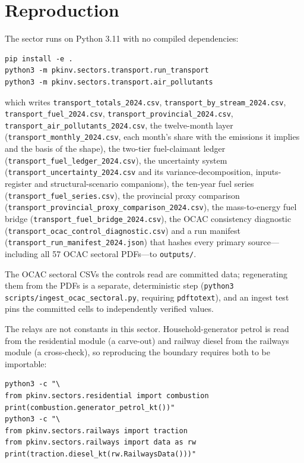 \section{Reproduction}
\label{app:repro}

The sector runs on Python 3.11 with no compiled dependencies:

{\footnotesize
\begin{verbatim}
pip install -e .
python3 -m pkinv.sectors.transport.run_transport
python3 -m pkinv.sectors.transport.air_pollutants
\end{verbatim}
}

which writes \texttt{transport\_totals\_2024.csv},
\texttt{transport\_by\_stream\_2024.csv}, \texttt{transport\_fuel\_2024.csv},
\texttt{transport\_provincial\_2024.csv},
\texttt{transport\_air\_pollutants\_2024.csv}, the twelve-month layer
(\texttt{transport\_\allowbreak monthly\_\allowbreak 2024.csv}, each month's share with the emissions it implies
and the basis of the shape), the two-tier fuel-claimant ledger
(\texttt{transport\_fuel\_ledger\_2024.csv}), the uncertainty system
(\texttt{transport\_uncertainty\_2024.csv} and its variance-decomposition, inputs-register
and structural-scenario companions), the ten-year fuel series
(\texttt{transport\_fuel\_series.csv}), the provincial proxy comparison
(\texttt{transport\_provincial\_proxy\_comparison\_2024.csv}), the mass-to-energy fuel
bridge (\texttt{transport\_fuel\_bridge\_2024.csv}), the OCAC consistency diagnostic
(\texttt{transport\_ocac\_control\_diagnostic.csv}) and a run manifest
(\texttt{transport\_run\_manifest\_2024.json}) that hashes every primary source---
including all 57 OCAC sectoral PDFs---to \texttt{outputs/}.

The OCAC sectoral CSVs the controls read are committed data; regenerating them from the
PDFs is a separate, deterministic step
(\texttt{python3 scripts/ingest\_ocac\_sectoral.py}, requiring \texttt{pdftotext}), and
an ingest test pins the committed cells to independently verified values.

The relays are not constants in this sector. Household-generator petrol is read from the
residential module (a carve-out) and railway diesel from the railways module (a
cross-check), so reproducing the boundary requires both to be importable:

\begin{verbatim}
python3 -c "\
from pkinv.sectors.residential import combustion
print(combustion.generator_petrol_kt())"
python3 -c "\
from pkinv.sectors.railways import traction
from pkinv.sectors.railways import data as rw
print(traction.diesel_kt(rw.RailwaysData()))"
\end{verbatim}

